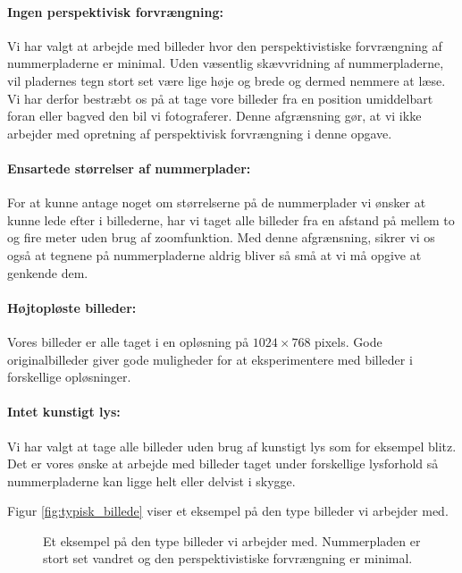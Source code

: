 \paragraph{Ingen perspektivisk forvrængning:}
Vi har valgt at arbejde med billeder hvor den perspektivistiske forvrængning af nummerpladerne er minimal. Uden væsentlig skævvridning af nummerpladerne, vil pladernes tegn stort set være lige høje og brede og dermed nemmere at læse. Vi har derfor bestræbt os på at tage vore billeder fra en position umiddelbart foran eller bagved den bil vi fotograferer. Denne afgrænsning gør, at vi ikke arbejder med opretning af perspektivisk forvrængning i denne opgave.

\paragraph{Ensartede størrelser af nummerplader:}
For at kunne antage noget om størrelserne på de nummerplader vi ønsker at kunne lede efter i billederne, har vi taget alle billeder fra en afstand på mellem to og fire meter uden brug af zoomfunktion. Med denne afgrænsning, sikrer vi os også at tegnene på nummerpladerne aldrig bliver så små at vi må opgive at genkende dem.

\paragraph{Højtopløste billeder:}
Vores billeder er alle taget i en opløsning på $1024 \times 768$ pixels. Gode originalbilleder giver gode muligheder for at eksperimentere med billeder i forskellige opløsninger. 

\paragraph{Intet kunstigt lys:}
Vi har valgt at tage alle billeder uden brug af kunstigt lys som for eksempel blitz. Det er vores ønske at arbejde med billeder taget under forskellige lysforhold så nummerpladerne kan ligge helt eller delvist i skygge.  

Figur \vref{fig:typisk_billede} viser et eksempel på den type billeder vi arbejder med.

\begin{figure}[htp]
\centering
{} 
\caption{Et eksempel på den type billeder vi arbejder med. Nummerpladen er stort set vandret og den perspektivistiske forvrængning er minimal.}
\label{fig:typisk_billede}
\end{figure}

